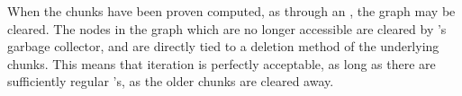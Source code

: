 
When the chunks have been proven computed, as through an , the graph may be cleared.
The nodes in the graph which are no longer accessible are cleared by \R{}'s garbage collector, and are directly tied to a deletion method of the underlying chunks.
This means that iteration is perfectly acceptable, as long as there are sufficiently regular 's, as the older chunks are cleared away.
